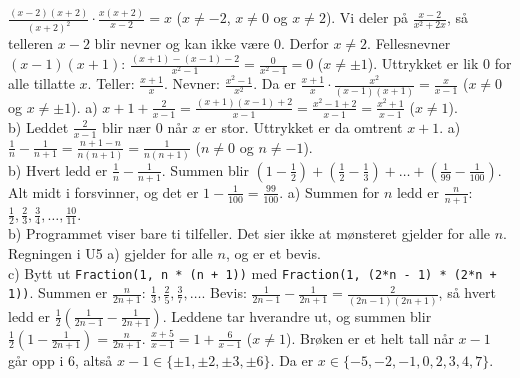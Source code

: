  $\frac{(x-2)(x+2)}{(x+2)^2}\cdot\frac{x(x+2)}{x-2} = x$ ($x \neq -2$, $x \neq 0$ og $x \neq 2$).
Vi deler på $\frac{x-2}{x^2+2x}$, så telleren $x-2$ blir nevner og kan ikke være 0. Derfor $x \neq 2$.
 Fellesnevner $(x-1)(x+1)$: $\frac{(x+1)-(x-1)-2}{x^2-1} = \frac{0}{x^2-1} = 0$ ($x \neq \pm 1$).
Uttrykket er lik 0 for alle tillatte $x$.
 Teller: $\frac{x+1}{x}$. Nevner: $\frac{x^2-1}{x^2}$. Da er $\frac{x+1}{x}\cdot\frac{x^2}{(x-1)(x+1)} = \frac{x}{x-1}$ ($x \neq 0$ og $x \neq \pm 1$).
 a) $x+1+\frac{2}{x-1} = \frac{(x+1)(x-1)+2}{x-1} = \frac{x^2-1+2}{x-1} = \frac{x^2+1}{x-1}$ ($x \neq 1$).\\
b) Leddet $\frac{2}{x-1}$ blir nær 0 når $x$ er stor. Uttrykket er da omtrent $x+1$.
 a) $\frac{1}{n}-\frac{1}{n+1} = \frac{n+1-n}{n(n+1)} = \frac{1}{n(n+1)}$ ($n \neq 0$ og $n \neq -1$).\\
b) Hvert ledd er $\frac{1}{n}-\frac{1}{n+1}$. Summen blir $\left(1-\frac12\right)+\left(\frac12-\frac13\right)+\ldots+\left(\frac{1}{99}-\frac{1}{100}\right)$.
Alt midt i forsvinner, og det er $1-\frac{1}{100} = \frac{99}{100}$.
 a) Summen for $n$ ledd er $\frac{n}{n+1}$: $\frac12, \frac23, \frac34, \ldots, \frac{10}{11}$.\\
b) Programmet viser bare ti tilfeller. Det sier ikke at mønsteret gjelder for alle $n$. Regningen i U5 a) gjelder for alle $n$, og er et bevis.\\
c) Bytt ut \lstinline[style=laereverk,numbers=none,frame=none]|Fraction(1, n * (n + 1))| med \lstinline[style=laereverk,numbers=none,frame=none]|Fraction(1, (2*n - 1) * (2*n + 1))|. Summen er $\frac{n}{2n+1}$: $\frac13, \frac25, \frac37, \ldots$.
Bevis: $\frac{1}{2n-1}-\frac{1}{2n+1} = \frac{2}{(2n-1)(2n+1)}$, så hvert ledd er $\frac12\left(\frac{1}{2n-1}-\frac{1}{2n+1}\right)$.
Leddene tar hverandre ut, og summen blir $\frac12\left(1-\frac{1}{2n+1}\right) = \frac{n}{2n+1}$.
 $\frac{x+5}{x-1} = 1+\frac{6}{x-1}$ ($x \neq 1$). Brøken er et helt tall når $x-1$ går opp i 6, altså $x-1 \in \{\pm1, \pm2, \pm3, \pm6\}$.
Da er $x \in \{-5, -2, -1, 0, 2, 3, 4, 7\}$.
